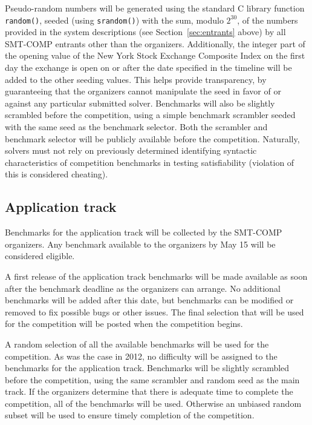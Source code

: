 \documentclass[12pt]{article}
\begin{document}
Pseudo-random numbers will be generated using the standard C library
function \texttt{random()}, seeded (using \texttt{srandom()}) with the
sum, modulo $2^{30}$, of the numbers provided in the system
descriptions (see Section~\ref{sec:entrants} above) by all SMT-COMP
entrants other than the organizers.  Additionally, the integer part of
the opening value of the New York Stock Exchange Composite Index on
the first day the exchange is open on or after the date specified in the timeline
will be added to the other seeding values.  This helps provide transparency,
by guaranteeing that the organizers cannot manipulate the seed in
favor of or against any particular submitted solver.  Benchmarks will also be slightly
scrambled before the competition, using a simple benchmark scrambler
seeded with the same seed as the benchmark selector.  Both the
scrambler and benchmark selector will be publicly available before the
competition.  Naturally, solvers must not rely on previously
determined identifying syntactic characteristics of competition
benchmarks in testing satisfiability (violation of this is considered
cheating).

\subsection{Application track}

Benchmarks for the application track will be collected by the SMT-COMP organizers.
Any benchmark available to the organizers by May 15 will be considered eligible.

A first release of the application track
benchmarks will be made available as soon after the benchmark deadline as the organizers can arrange.
No additional
benchmarks will be added after this date, but benchmarks can be
modified or removed to fix possible bugs or other issues. 
The final selection that will be used for the competition will be posted when the competition begins.

A random selection of all the available benchmarks will be used for the competition. 
As was the case in 2012, no difficulty will be assigned to the benchmarks for the application track.
Benchmarks will be slightly scrambled before the competition, using the same scrambler and 
random seed as the main track. 
If the organizers determine that there is adequate time to complete the competition, all of the benchmarks will be used. Otherwise an unbiased random subset will be used to ensure timely completion of the competition.
\end{document}
